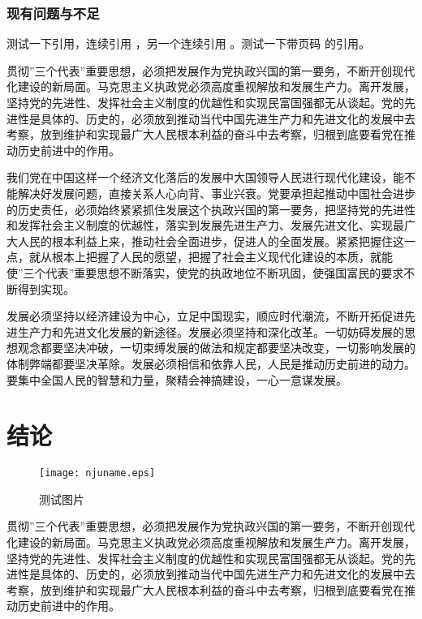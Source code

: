 \documentclass{njuthesis}
\begin{document}
\subsection{现有问题与不足}

测试一下引用\cite{newman2006structure}，连续引用
\cite{newman2001random,aiello2000random,bollobas2001random}，另一个连续引用
\cite{newman2001random,bollobas2001random,barabasi1999emergence}。测试一下带页码
的引用\cite[124--128]{erdHos1961strength}。

贯彻”三个代表”重要思想，必须把发展作为党执政兴国的第一要务，不断开创现代化建设的新局面。马克思主义执政党必须高度重视解放和发展生产力。离开发展，坚持党的先进性、发挥社会主义制度的优越性和实现民富国强都无从谈起。党的先进性是具体的、历史的，必须放到推动当代中国先进生产力和先进文化的发展中去考察，放到维护和实现最广大人民根本利益的奋斗中去考察，归根到底要看党在推动历史前进中的作用。 

我们党在中国这样一个经济文化落后的发展中大国领导人民进行现代化建设，能不能解决好发展问题，直接关系人心向背、事业兴衰。党要承担起推动中国社会进步的历史责任，必须始终紧紧抓住发展这个执政兴国的第一要务，把坚持党的先进性和发挥社会主义制度的优越性，落实到发展先进生产力、发展先进文化、实现最广大人民的根本利益上来，推动社会全面进步，促进人的全面发展。紧紧把握住这一点，就从根本上把握了人民的愿望，把握了社会主义现代化建设的本质，就能使”三个代表”重要思想不断落实，使党的执政地位不断巩固，使强国富民的要求不断得到实现。 

发展必须坚持以经济建设为中心，立足中国现实，顺应时代潮流，不断开拓促进先进生产力和先进文化发展的新途径。发展必须坚持和深化改革。一切妨碍发展的思想观念都要坚决冲破，一切束缚发展的做法和规定都要坚决改变，一切影响发展的体制弊端都要坚决革除。发展必须相信和依靠人民，人民是推动历史前进的动力。要集中全国人民的智慧和力量，聚精会神搞建设，一心一意谋发展。 

\chapter{结论}

\begin{figure}[htbp]
   \centering
   \texttt{[image: njuname.eps]} %
   \caption{测试图片}
   \label{fig:example}
\end{figure}

贯彻”三个代表”重要思想，必须把发展作为党执政兴国的第一要务，不断开创现代化建设的新局面。马克思主义执政党必须高度重视解放和发展生产力。离开发展，坚持党的先进性、发挥社会主义制度的优越性和实现民富国强都无从谈起。党的先进性是具体的、历史的，必须放到推动当代中国先进生产力和先进文化的发展中去考察，放到维护和实现最广大人民根本利益的奋斗中去考察，归根到底要看党在推动历史前进中的作用。 
\end{document}
